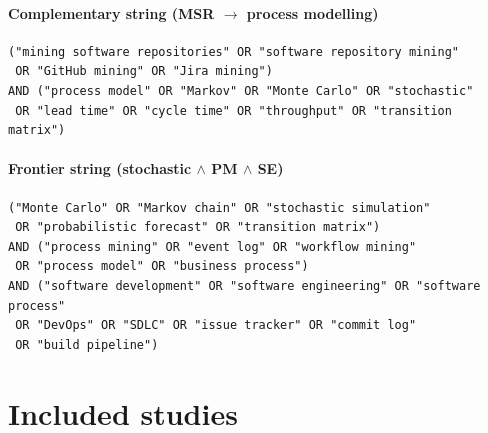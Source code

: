 \documentclass[preprint,12pt,authoryear=false]{elsarticle}
\begin{document}
\paragraph{Complementary string (MSR $\rightarrow$ process modelling)}
\begin{footnotesize}\begin{verbatim}
("mining software repositories" OR "software repository mining"
 OR "GitHub mining" OR "Jira mining")
AND ("process model" OR "Markov" OR "Monte Carlo" OR "stochastic"
 OR "lead time" OR "cycle time" OR "throughput" OR "transition matrix")
\end{verbatim}\end{footnotesize}

\paragraph{Frontier string (stochastic $\wedge$ PM $\wedge$ SE)}
\begin{footnotesize}\begin{verbatim}
("Monte Carlo" OR "Markov chain" OR "stochastic simulation"
 OR "probabilistic forecast" OR "transition matrix")
AND ("process mining" OR "event log" OR "workflow mining"
 OR "process model" OR "business process")
AND ("software development" OR "software engineering" OR "software process"
 OR "DevOps" OR "SDLC" OR "issue tracker" OR "commit log"
 OR "build pipeline")
\end{verbatim}\end{footnotesize}

\section{Included studies}\label{app:studies}




\end{document}

